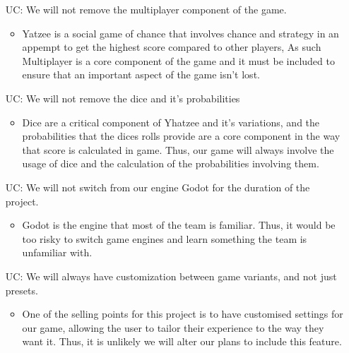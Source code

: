 \noindent \begin{itemize}

\item[UC\refstepcounter{ucnum}\theucnum\label{LC_meaningfulLabel}:] We will not remove the multiplayer component of the game.

\begin{itemize}
	\item Yatzee is a social game of chance that involves chance and strategy in an appempt to get the highest score compared to other players, As such Multiplayer is a core component of the game and it must be included to ensure that an important aspect of the game isn't lost.
\end{itemize}

	
\item[UC\refstepcounter{ucnum}\theucnum\label{LC_meaningfulLabel}:] We will not remove the dice and it's probabilities 

\begin{itemize}
	\item Dice are a critical component of Yhatzee and it's variations, and the probabilities that the dices rolls provide are a core component in the way that score is calculated in game. Thus, our game will always involve the usage of dice and the calculation of the probabilities involving them.
\end{itemize}


\item[UC\refstepcounter{ucnum}\theucnum\label{LC_meaningfulLabel}:] We will not switch from our engine Godot for the duration of the project.

\begin{itemize}
	\item Godot is the engine that most of the team is familiar. Thus, it would be too risky to switch game engines and learn something the team is unfamiliar with.
\end{itemize}

\item[UC\refstepcounter{ucnum}\theucnum\label{LC_meaningfulLabel}:] We will always have customization between game variants, and not just presets.


\begin{itemize}
	\item One of the selling points for this project is to have customised settings for our game, allowing the user to tailor their experience to the way they want it. Thus, it is unlikely we will alter our plans to include this feature.
\end{itemize}


\end{itemize}
